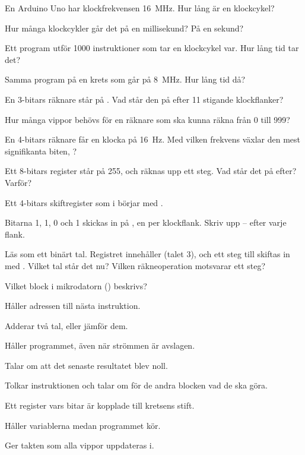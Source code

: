 \label{c6:ex:5}
\begin{parts}
  \item En Arduino Uno har klockfrekvensen 16~MHz. Hur lång är en klockcykel?
  \item Hur många klockcykler går det på en millisekund? På en sekund?
  \item Ett program utför 1000 instruktioner som tar en klockcykel var. Hur lång tid tar det?
  \item Samma program på en krets som går på 8~MHz. Hur lång tid då?
\end{parts}

\label{c6:ex:6}
\begin{parts}
  \item En 3-bitars räknare står på . Vad står den på efter 11 stigande klockflanker?
  \item Hur många vippor behövs för en räknare som ska kunna räkna från 0 till 999?
  \item En 4-bitars räknare får en klocka på 16~Hz. Med vilken frekvens växlar den mest
    signifikanta biten, ?
  \item Ett 8-bitars register står på 255, och räknas upp ett steg. Vad står det på efter? Varför?
\end{parts}

\label{c6:ex:7}
Ett 4-bitars skiftregister som i  börjar med .
\begin{parts}
  \item Bitarna 1, 1, 0 och 1 skickas in på , en per klockflank. Skriv upp
    -- efter varje flank.
  \item Läs  som ett binärt tal. Registret innehåller  (talet 3), och
    ett steg till skiftas in med . Vilket tal står det nu? Vilken räkneoperation
    motsvarar ett steg?
\end{parts}

\label{c6:ex:8}
Vilket block i mikrodatorn () beskrivs?
\begin{parts}
  \item Håller adressen till nästa instruktion.
  \item Adderar två tal, eller jämför dem.
  \item Håller programmet, även när strömmen är avslagen.
  \item Talar om att det senaste resultatet blev noll.
  \item Tolkar instruktionen och talar om för de andra blocken vad de ska göra.
  \item Ett register vars bitar är kopplade till kretsens stift.
  \item Håller variablerna medan programmet kör.
  \item Ger takten som alla vippor uppdateras i.
\end{parts}

